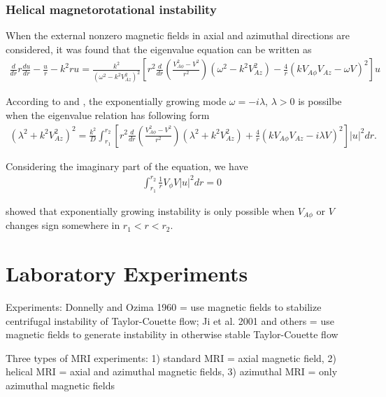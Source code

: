 \documentclass{jfm}
\begin{document}
\subsubsection{Helical magnetorotational instability}

When the external nonzero magnetic fields in axial and azimuthal directions are
considered, it was found that the eigenvalue equation can be written as
\begin{align}
    \frac{d}{dr}r\frac{du}{dr}-\frac{u}{r}-k^2ru = \frac{k^2}{(\omega^2-k^2 V_{Az}^2)^2}\left[r^2 \frac{d}{dr}\left(\frac{V_{A\phi}^2-V^2}{r^2}\right)
    (\omega^2-k^2V_{Az}^2) 
    -\frac{4}{r}(kV_{A\phi}V_{Az}-\omega V)^2\right]u
\end{align}

According to \cite{Knobloch1992} and \cite{Julien2010}, the exponentially 
growing mode $\omega =-i\lambda$, $\lambda>0$ is possilbe when the eigenvalue 
relation has following form
\begin{align}
    (\lambda^2 +k^2 V_{Az}^2)^2 = \frac{k^2}{D}\int_{r_1}^{r_2} \left[ r^2 \frac{d}{dr}\left( \frac{V_{A\phi}^2-V^2}{r^2}\right)(\lambda^2+k^2 V_{Az}^2) + \frac{4}{r}(k V_{A\phi} V_{Az}-i\lambda V)^2 \right]|u|^2 dr.
\end{align}

Considering the imaginary part of the equation, we have 
\begin{align}
    \int_{r_1}^{r_2} \frac{1}{r}V_\phi V |u|^2 dr =0
\end{align}

\cite{Knobloch1992} showed that exponentially growing instability is only possible 
when $V_{A\phi}$ or $V$ changes sign somewhere in $r_1< r < r_2$.


\section{Laboratory Experiments}
\label{sec:experiments}

Experiments: Donnelly and Ozima 1960 = use magnetic fields to stabilize 
centrifugal instability of Taylor-Couette flow; Ji et al. 2001 and others = 
use magnetic fields to generate instability in otherwise stable Taylor-Couette flow

Three types of MRI experiments: 1) standard MRI = axial magnetic field, 2) 
helical MRI = axial and azimuthal magnetic fields, 3) azimuthal MRI = only 
azimuthal magnetic fields
\end{document}
